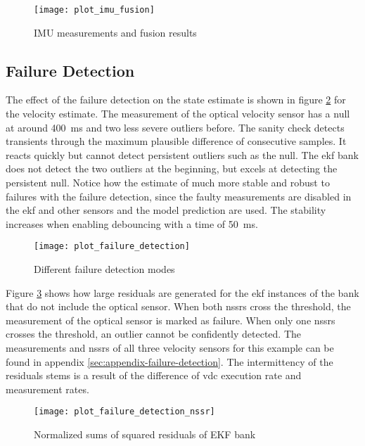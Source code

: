 \begin{figure}[t]
	\centering
	\texttt{[image: plot\_imu\_fusion]}%
	\caption{IMU measurements and fusion results}
	\label{fig:imu-fusion}
\end{figure}


\subsection{Failure Detection}
The effect of the failure detection on the state estimate is shown in figure \ref{fig:failure-detection} for the velocity estimate. The measurement of the optical velocity sensor has a null at around \SI{400}{\milli\second} and two less severe outliers before. The sanity check detects transients through the maximum plausible difference of consecutive samples. It reacts quickly but cannot detect persistent outliers such as the null. The \gls{ekf} bank does not detect the two outliers at the beginning, but excels at detecting the persistent null. Notice how the estimate of much more stable and robust to failures with the failure detection, since the faulty measurements are disabled in the \gls{ekf} and other sensors and the model prediction are used. The stability increases when enabling debouncing with a time of \SI{50}{\milli\second}.

\begin{figure}[t]
	\centering
	\texttt{[image: plot\_failure\_detection]}%
	\caption{Different failure detection modes}
	\label{fig:failure-detection}
\end{figure}

Figure \ref{fig:failure-detection-nssr} shows how large residuals are generated for the \gls{ekf} instances of the bank that do not include the optical sensor. When both \glspl{nssr} cross the threshold, the measurement of the optical sensor is marked as failure. When only one \glspl{nssr} crosses the threshold, an outlier cannot be confidently detected. The measurements and \glspl{nssr} of all three velocity sensors for this example can be found in appendix \ref{sec:appendix-failure-detection}. The intermittency of the residuals stems is a result of the difference of \gls{vdc} execution rate and measurement rates.

\begin{figure}[t]
	\centering
	\texttt{[image: plot\_failure\_detection\_nssr]}%
	\caption{Normalized sums of squared residuals of EKF bank}
	\label{fig:failure-detection-nssr}
\end{figure}

